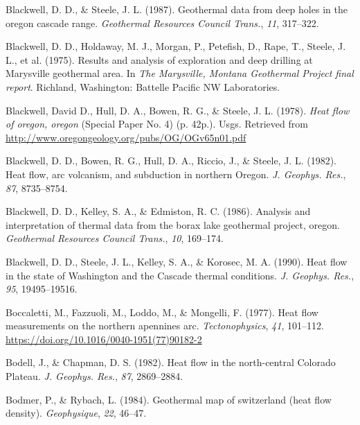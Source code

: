 \documentclass[draft,linenumbers]{agujournal2018}
\begin{document}
\leavevmode{}%
Blackwell, D. D., \& Steele, J. L. (1987). Geothermal data from deep
holes in the oregon cascade range. \emph{Geothermal Resources Council
Trans.}, \emph{11}, 317--322.

\leavevmode{}%
Blackwell, D. D., Holdaway, M. J., Morgan, P., Petefish, D., Rape, T.,
Steele, J. L., et al. (1975). Results and analysis of exploration and
deep drilling at {Marysville} geothermal area. In \emph{The {Marysville,
Montana Geothermal Project} final report}. Richland, Washington:
Battelle Pacific NW Laboratories.

\leavevmode{}%
Blackwell, David D., Hull, D. A., Bowen, R. G., \& Steele, J. L. (1978).
\emph{Heat flow of oregon, oregon} (Special Paper No. 4) (p. 42p.).
Usgs. Retrieved from
\url{http://www.oregongeology.org/pubs/OG/OGv65n01.pdf}

\leavevmode{}%
Blackwell, D. D., Bowen, R. G., Hull, D. A., Riccio, J., \& Steele, J.
L. (1982). Heat flow, arc volcanism, and subduction in northern
{Oregon}. \emph{J. Geophys. Res.}, \emph{87}, 8735--8754.

\leavevmode{}%
Blackwell, D. D., Kelley, S. A., \& Edmiston, R. C. (1986). Analysis and
interpretation of thermal data from the borax lake geothermal project,
oregon. \emph{Geothermal Resources Council Trans.}, \emph{10}, 169--174.

\leavevmode{}%
Blackwell, D. D., Steele, J. L., Kelley, S. A., \& Korosec, M. A.
(1990). Heat flow in the state of {Washington} and the {Cascade} thermal
conditions. \emph{J. Geophys. Res.}, \emph{95}, 19495--19516.

\leavevmode{}%
Boccaletti, M., Fazzuoli, M., Loddo, M., \& Mongelli, F. (1977). Heat
flow measurements on the northern apennines arc. \emph{Tectonophysics},
\emph{41}, 101--112. \url{https://doi.org/10.1016/0040-1951(77)90182-2}

\leavevmode{}%
Bodell, J., \& Chapman, D. S. (1982). Heat flow in the north-central
{Colorado Plateau}. \emph{J. Geophys. Res.}, \emph{87}, 2869--2884.

\leavevmode{}%
Bodmer, P., \& Rybach, L. (1984). Geothermal map of switzerland (heat
flow density). \emph{Geophysique}, \emph{22}, 46--47.
\end{document}
